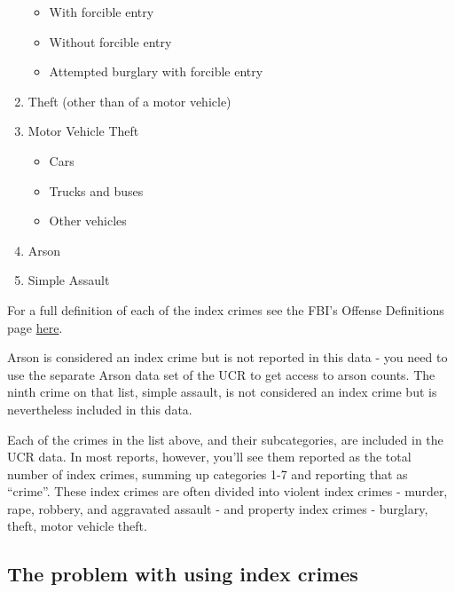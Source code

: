 \documentclass[
  12pt,
  openany]{book}
\providecommand{\tightlist}{%
  \setlength{\itemsep}{0pt}\setlength{\parskip}{0pt}}
\begin{document}
\begin{enumerate}
  \begin{itemize}
  \tightlist
  \item
    With forcible entry\\
  \item
    Without forcible entry\\
  \item
    Attempted burglary with forcible entry\\
  \end{itemize}
\item
  Theft (other than of a motor vehicle)\\
\item
  Motor Vehicle Theft

  \begin{itemize}
  \tightlist
  \item
    Cars\\
  \item
    Trucks and buses\\
  \item
    Other vehicles\\
  \end{itemize}
\item
  Arson\\
\item
  Simple Assault
\end{enumerate}

For a full definition of each of the index crimes see the FBI's Offense Definitions page \href{https://ucrdatatool.gov/offenses.cfm}{here}.

Arson is considered an index crime but is not reported in this data - you need to use the separate Arson data set of the UCR to get access to arson counts. The ninth crime on that list, simple assault, is not considered an index crime but is nevertheless included in this data.

Each of the crimes in the list above, and their subcategories, are included in the UCR data. In most reports, however, you'll see them reported as the total number of index crimes, summing up categories 1-7 and reporting that as ``crime''. These index crimes are often divided into violent index crimes - murder, rape, robbery, and aggravated assault - and property index crimes - burglary, theft, motor vehicle theft.

\hypertarget{the-problem-with-using-index-crimes}{%
\subsection{The problem with using index crimes}\label{the-problem-with-using-index-crimes}}
\end{document}
